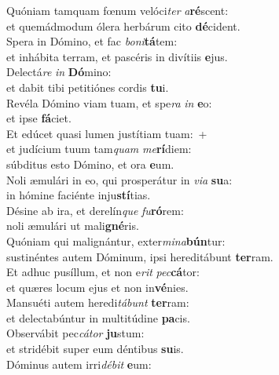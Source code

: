 \evenverse Quóniam tamquam fœnum velóci\textit{ter} \textit{a}\textbf{ré}scent:~\*\\
\evenverse et quemádmodum ólera herbárum cito \textbf{dé}cident.\\
\oddverse Spera in Dómino, et fac \textit{bo}\textit{ni}\textbf{tá}tem:~\*\\
\oddverse et inhábita terram, et pascéris in divítiis \textbf{e}jus.\\
\evenverse Delectá\textit{re} \textit{in} \textbf{Dó}mino:~\*\\
\evenverse et dabit tibi petitiónes cordis \textbf{tu}i.\\
\oddverse Revéla Dómino viam tuam, et spe\textit{ra} \textit{in} \textbf{e}o:~\*\\
\oddverse et ipse \textbf{fá}ciet.\\
\evenverse Et edúcet quasi lumen justítiam tuam:~+\\
\evenverse  et judícium tuum tam\textit{quam} \textit{me}\textbf{rí}diem:~\*\\
\evenverse súbditus esto Dómino, et ora \textbf{e}um.\\
\oddverse Noli æmulári in eo, qui prosperátur in \textit{vi}\textit{a} \textbf{su}a:~\*\\
\oddverse in hómine faciénte inju\textbf{stí}tias.\\
\evenverse Désine ab ira, et derelín\textit{que} \textit{fu}\textbf{ró}rem:~\*\\
\evenverse noli æmulári ut mali\textbf{gné}ris.\\
\oddverse Quóniam qui malignántur, exter\textit{mi}\textit{na}\textbf{bún}tur:~\*\\
\oddverse sustinéntes autem Dóminum, ipsi hereditábunt \textbf{ter}ram.\\
\evenverse Et adhuc pusíllum, et non e\textit{rit} \textit{pec}\textbf{cá}tor:~\*\\
\evenverse et quæres locum ejus et non in\textbf{vé}nies.\\
\oddverse Mansuéti autem heredi\textit{tá}\textit{bunt} \textbf{ter}ram:~\*\\
\oddverse et delectabúntur in multitúdine \textbf{pa}cis.\\
\evenverse Observábit pec\textit{cá}\textit{tor} \textbf{ju}stum:~\*\\
\evenverse et stridébit super eum déntibus \textbf{su}is.\\
\oddverse Dóminus autem irri\textit{dé}\textit{bit} \textbf{e}um:~\*\\

